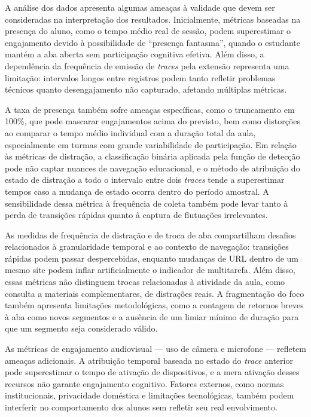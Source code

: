 A análise dos dados apresenta algumas ameaças à validade que devem ser consideradas na interpretação dos resultados. Inicialmente, métricas baseadas na presença do aluno, como o tempo médio real de sessão, podem superestimar o engajamento devido à possibilidade de ``presença fantasma'', quando o estudante mantém a aba aberta sem participação cognitiva efetiva. Além disso, a dependência da frequência de emissão de \textit{traces} pela extensão representa uma limitação: intervalos longos entre registros podem tanto refletir problemas técnicos quanto desengajamento não capturado, afetando múltiplas métricas.

A taxa de presença também sofre ameaças específicas, como o truncamento em 100\%, que pode mascarar engajamentos acima do previsto, bem como distorções ao comparar o tempo médio individual com a duração total da aula, especialmente em turmas com grande variabilidade de participação. Em relação às métricas de distração, a classificação binária aplicada pela função de detecção pode não captar nuances de navegação educacional, e o método de atribuição do estado de distração a todo o intervalo entre dois \textit{traces} tende a superestimar tempos caso a mudança de estado ocorra dentro do período amostral. A sensibilidade dessa métrica à frequência de coleta também pode levar tanto à perda de transições rápidas quanto à captura de flutuações irrelevantes.

As medidas de frequência de distração e de troca de aba compartilham desafios relacionados à granularidade temporal e ao contexto de navegação: transições rápidas podem passar despercebidas, enquanto mudanças de URL dentro de um mesmo site podem inflar artificialmente o indicador de multitarefa. Além disso, essas métricas não distinguem trocas relacionadas à atividade da aula, como consulta a materiais complementares, de distrações reais. A fragmentação do foco também apresenta limitações metodológicas, como a contagem de retornos breves à aba como novos segmentos e a ausência de um limiar mínimo de duração para que um segmento seja considerado válido.

As métricas de engajamento audiovisual --- uso de câmera e microfone --- refletem ameaças adicionais. A atribuição temporal baseada no estado do \textit{trace} anterior pode superestimar o tempo de ativação de dispositivos, e a mera ativação desses recursos não garante engajamento cognitivo. Fatores externos, como normas institucionais, privacidade doméstica e limitações tecnológicas, também podem interferir no comportamento dos alunos sem refletir seu real envolvimento.


